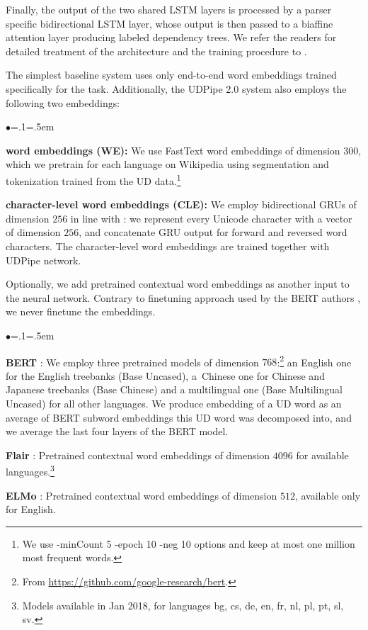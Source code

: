 \documentclass[11pt,a4paper]{article}
\newenvironment{citemize}{\begin{list}{$\bullet$}{\topsep=.1\smallskipamount\itemsep=0pt\parsep=1pt\labelwidth=.5em}}{\end{list}}
\begin{document}
Finally, the output of the two shared LSTM layers is processed by
a parser specific bidirectional LSTM layer, whose output is then passed to
a biaffine attention layer \cite{dozat:2016} producing labeled dependency
trees. We refer the readers for detailed treatment of the architecture and
the training procedure to \citet{UDPipe2.0}.

The simplest baseline system uses only end-to-end word embeddings trained
specifically for the task.
Additionally, the UDPipe 2.0 system also employs the following two embeddings:
\begin{citemize}
  \item \textbf{word embeddings (WE):} We use FastText word embeddings
    \cite{FastText} of dimension $300$, which we pretrain for each language
    on Wikipedia using segmentation and tokenization trained from the UD
    data.\footnote{We use {\scriptsize\ttfamily-minCount 5 -epoch 10 -neg 10}
    options and keep at most one million most frequent words.}
  \item \textbf{character-level word embeddings (CLE):} We employ bidirectional
    GRUs of dimension $256$ in line with
    \citet{Ling2015}: we represent every Unicode character with a vector of
    dimension $256$, and concatenate GRU output for forward and reversed word
    characters. The character-level word embeddings are trained together with
    UDPipe network.
\end{citemize}

Optionally, we add pretrained contextual word embeddings as another input
to the neural network. Contrary to finetuning approach used by the BERT
authors \citep{BERT}, we never finetune the embeddings.

\begin{citemize}
    \item \textbf{BERT} \cite{BERT}: We employ three pretrained models of dimension $768$:\footnote{From
    \scriptsize\url{https://github.com/google-research/bert}.}
    an English one for the English treebanks ({\footnotesize\ttfamily Base Uncased}), a~Chinese
    one for Chinese and Japanese treebanks ({\footnotesize\ttfamily Base Chinese}) and
    a multilingual one ({\footnotesize\ttfamily Base Multilingual Uncased}) for all other languages.
    We produce embedding of a UD word as an average
    of BERT subword embeddings this UD word was decomposed into, and we
    average the last four layers of the BERT model.
    \item \textbf{Flair} \cite{Akbik}: Pretrained contextual word
    embeddings of dimension $4096$ for available languages.\footnote{Models
    available in Jan 2018, for languages {\scriptsize\ttfamily bg}, {\scriptsize\ttfamily cs},
    {\scriptsize\ttfamily de}, {\scriptsize\ttfamily en}, {\scriptsize\ttfamily fr}, {\scriptsize\ttfamily nl},
    {\scriptsize\ttfamily pl}, {\scriptsize\ttfamily pt}, {\scriptsize\ttfamily sl}, {\scriptsize\ttfamily sv}.}
    \item \textbf{ELMo} \cite{Peters2018}: Pretrained contextual
    word embeddings of dimension $512$, available only for English.
\end{citemize}
\end{document}
